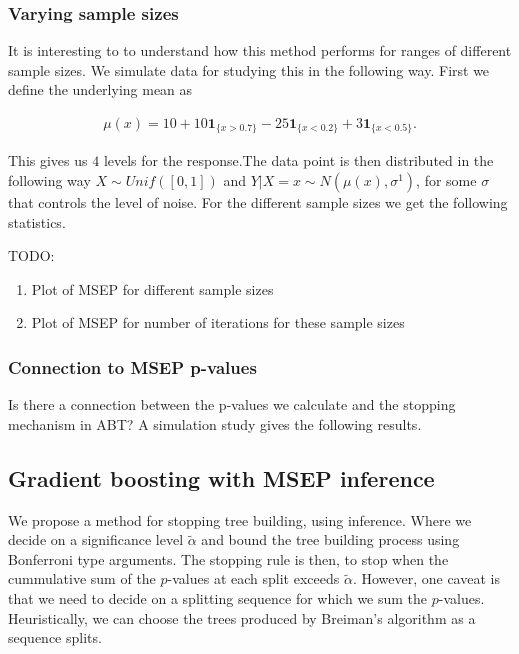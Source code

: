 \documentclass{article}
\theoremstyle{definition}
\theoremstyle{remark}
\begin{document}
\subsubsection{Varying sample sizes}

It is interesting to to understand how this method performs for ranges of different
sample sizes. We simulate data for studying this in the following way.
First we define the underlying mean as

\begin{align*}
  \mu(x) = 10 + 10\mathbf{1}_{\{x> 0.7\}} -25\mathbf{1}_{\{x < 0.2\}} +
  3\mathbf{1}_{\{x<0.5\}}.
\end{align*}

This gives us $ 4 $ levels for the response.The data point is then distributed in the following way
$ X \sim Unif([0,1]) $ and $ Y|X=x \sim N(\mu(x), \sigma^1)$, for some $ \sigma
$ that controls the level of noise. For the different sample sizes we get the
following statistics. 

TODO:
\begin{enumerate}

\item Plot of MSEP for different sample sizes
\item Plot of MSEP for number of iterations for these sample sizes

\end{enumerate}

\subsubsection{Connection to MSEP p-values}

Is there a connection between the p-values we calculate and the stopping
mechanism in ABT? A simulation study gives the following results.



\subsection{Gradient boosting with MSEP inference}

We propose a method for stopping tree building, using inference. Where we decide on a
significance level $ \tilde\alpha $ and bound the tree building process using
Bonferroni type arguments. The stopping rule is then, to stop when the
cummulative sum of
the $ p $-values at each split exceeds $ \tilde\alpha $. However, one caveat is that we
need to decide on a splitting sequence for which we sum the $ p $-values.
Heuristically, we can choose the trees produced by Breiman's algorithm as a sequence splits.
\end{document}
